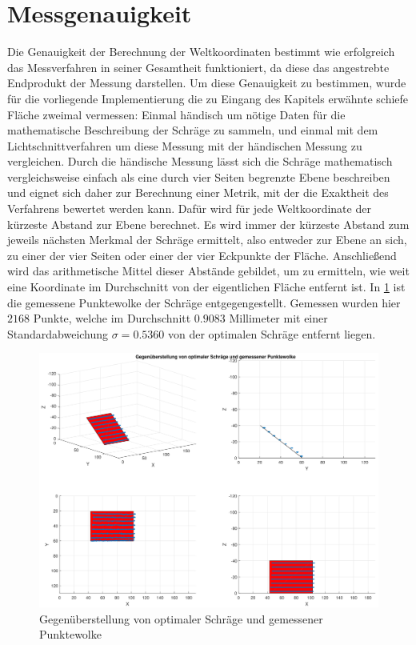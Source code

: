 \section{Messgenauigkeit}
Die Genauigkeit der Berechnung der Weltkoordinaten bestimmt wie erfolgreich das Messverfahren in seiner Gesamtheit funktioniert, da diese das angestrebte Endprodukt der Messung darstellen. Um diese Genauigkeit zu bestimmen, wurde für die vorliegende Implementierung die zu Eingang des Kapitels erwähnte schiefe Fläche zweimal vermessen: Einmal händisch um nötige Daten für die mathematische Beschreibung der Schräge zu sammeln, und einmal mit dem Lichtschnittverfahren um diese Messung mit der händischen Messung zu vergleichen. Durch die händische Messung lässt sich die Schräge mathematisch vergleichsweise einfach als eine durch vier Seiten begrenzte Ebene beschreiben und eignet sich daher zur Berechnung einer Metrik, mit der die Exaktheit des Verfahrens bewertet werden kann. Dafür wird für jede Weltkoordinate der kürzeste Abstand zur Ebene berechnet. Es wird immer der kürzeste Abstand zum jeweils nächsten Merkmal der Schräge ermittelt, also entweder zur Ebene an sich, zu einer der vier Seiten oder einer der vier Eckpunkte der Fläche. Anschließend wird das arithmetische Mittel dieser Abstände gebildet, um zu ermitteln, wie weit eine Koordinate im Durchschnitt von der eigentlichen Fläche entfernt ist. \linebreak
In \ref{fig:MessungSlope} ist die gemessene Punktewolke der Schräge entgegengestellt. Gemessen wurden hier \(2168\) Punkte, welche im Durchschnitt \(0.9083\) Millimeter mit einer Standardabweichung \(\sigma = 0.5360\) von  der optimalen Schräge entfernt liegen. \bigbreak

\begin{figure}
\centering \includegraphics[width=\textwidth]{images/Messung.pdf}
\caption[Gegenüberstellung von optimaler Schräge und gemessener Punktewolke]{Gegenüberstellung von optimaler Schräge und gemessener Punktewolke}\label{fig:MessungSlope}
\end{figure}

